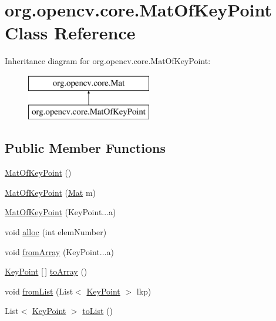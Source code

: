 \hypertarget{classorg_1_1opencv_1_1core_1_1_mat_of_key_point}{}\section{org.\+opencv.\+core.\+Mat\+Of\+Key\+Point Class Reference}
\label{classorg_1_1opencv_1_1core_1_1_mat_of_key_point}
Inheritance diagram for org.\+opencv.\+core.\+Mat\+Of\+Key\+Point\+:\begin{figure}[H]
\begin{center}
\leavevmode
\includegraphics[height=2.000000cm]{classorg_1_1opencv_1_1core_1_1_mat_of_key_point}
\end{center}
\end{figure}
\subsection*{Public Member Functions}
\begin{DoxyCompactItemize}
\item 
\mbox{\hyperlink{classorg_1_1opencv_1_1core_1_1_mat_of_key_point_af7ca86a3acb35d7f9264a7b35186ef8d}{Mat\+Of\+Key\+Point}} ()
\item 
\mbox{\hyperlink{classorg_1_1opencv_1_1core_1_1_mat_of_key_point_a9d4392bc71b70306b00358508f12e8bf}{Mat\+Of\+Key\+Point}} (\mbox{\hyperlink{classorg_1_1opencv_1_1core_1_1_mat}{Mat}} m)
\item 
\mbox{\hyperlink{classorg_1_1opencv_1_1core_1_1_mat_of_key_point_a907942ecd9619c439788388541f321f8}{Mat\+Of\+Key\+Point}} (Key\+Point...\+a)
\item 
void \mbox{\hyperlink{classorg_1_1opencv_1_1core_1_1_mat_of_key_point_a88cccd95fb47c749589f25c27e953813}{alloc}} (int elem\+Number)
\item 
void \mbox{\hyperlink{classorg_1_1opencv_1_1core_1_1_mat_of_key_point_a27731bf748cd82ed5c54a7b444b65692}{from\+Array}} (Key\+Point...\+a)
\item 
\mbox{\hyperlink{classorg_1_1opencv_1_1features2d_1_1_key_point}{Key\+Point}} \mbox{[}$\,$\mbox{]} \mbox{\hyperlink{classorg_1_1opencv_1_1core_1_1_mat_of_key_point_adaed14a07a9a561ee78e2f3ede4a4919}{to\+Array}} ()
\item 
void \mbox{\hyperlink{classorg_1_1opencv_1_1core_1_1_mat_of_key_point_a703b04862d7ddb179b9abe97bc7d8938}{from\+List}} (List$<$ \mbox{\hyperlink{classorg_1_1opencv_1_1features2d_1_1_key_point}{Key\+Point}} $>$ lkp)
\item 
List$<$ \mbox{\hyperlink{classorg_1_1opencv_1_1features2d_1_1_key_point}{Key\+Point}} $>$ \mbox{\hyperlink{classorg_1_1opencv_1_1core_1_1_mat_of_key_point_a596df9e23a120ed116b8249971509012}{to\+List}} ()
\end{DoxyCompactItemize}
